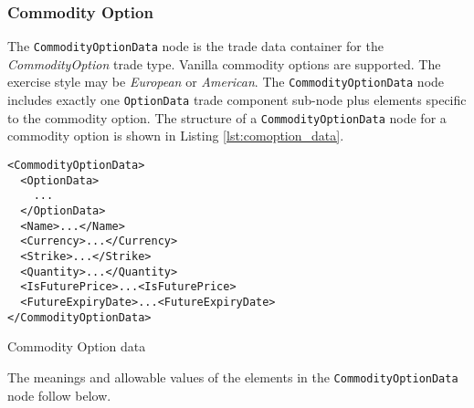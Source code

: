 \subsubsection{Commodity Option}
\label{ss:input_commodity_option}

The \lstinline!CommodityOptionData! node is the trade data container for the \emph{CommodityOption} trade type.  Vanilla commodity 
options are supported. The exercise style may be \emph{European} or \emph{American}. The \lstinline!CommodityOptionData! node includes exactly 
one \lstinline!OptionData! trade component sub-node plus elements specific to the commodity option. The structure of 
a \lstinline!CommodityOptionData! node for a commodity option is shown in Listing \ref{lst:comoption_data}.

\begin{listing}[H]
\begin{verbatim}
<CommodityOptionData>
  <OptionData>
    ...
  </OptionData>
  <Name>...</Name>
  <Currency>...</Currency>
  <Strike>...</Strike>
  <Quantity>...</Quantity>
  <IsFuturePrice>...<IsFuturePrice>
  <FutureExpiryDate>...<FutureExpiryDate>
</CommodityOptionData>
\end{verbatim}
\caption{Commodity Option data}
\label{lst:comoption_data}
\end{listing}

The meanings and allowable values of the elements in the \lstinline!CommodityOptionData!  node follow below.


